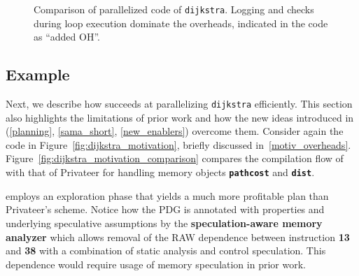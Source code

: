 \begin{figure}[!h]
\centering
\scriptsize
{}
\caption{Comparison of parallelized code of \texttt{dijkstra}. Logging and
checks during loop execution dominate the overheads, indicated in the code
as ``added OH''.}
\label{fig:dijkstra_motivation_comparison_source_code}
\end{figure}


\subsection{Example}
\label{motiv_example}

Next, we describe how \name succeeds at parallelizing \texttt{dijkstra}
efficiently. This section also highlights the limitations of prior
work and how the new ideas introduced in \name
(\cref{planning}, \cref{sama_short}, \cref{new_enablers}) overcome them.
%
Consider again the code in Figure~\ref{fig:dijkstra_motivation},
briefly discussed in~\cref{motiv_overheads}.
%
Figure~\ref{fig:dijkstra_motivation_comparison} compares the
compilation flow of \name with that of Privateer for handling memory objects
\texttt{\textbf{pathcost}} and \texttt{\textbf{dist}}.

\name employs an exploration phase that yields a much more profitable plan
than Privateer's scheme.
Notice how the PDG is annotated with properties and underlying speculative
assumptions by the \textbf{speculation-aware memory analyzer} which allows
removal of the RAW dependence between instruction \textbf{13} and
\textbf{38} with a combination of static analysis and control speculation.
This dependence would require usage of memory speculation in prior work.
%

